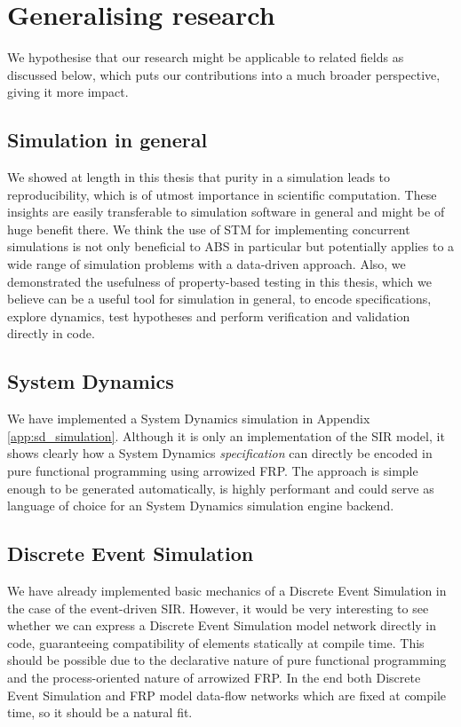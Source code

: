 \section{Generalising research}
We hypothesise that our research might be applicable to related fields as discussed below, which puts our contributions into a much broader perspective, giving it more impact.

\subsection{Simulation in general}
We showed at length in this thesis that purity in a simulation leads to reproducibility, which is of utmost importance in scientific computation. These insights are easily transferable to simulation software in general and might be of huge benefit there. %
We think the use of STM for implementing concurrent simulations is not only beneficial to ABS in particular but potentially applies to a wide range of simulation problems with a data-driven approach. Also, we demonstrated the usefulness of property-based testing in this thesis, which we believe can be a useful tool for simulation in general, to encode specifications, explore dynamics, test hypotheses and perform verification and validation directly in code.

\subsection{System Dynamics}
We have implemented a System Dynamics simulation in Appendix \ref{app:sd_simulation}. Although it is only an implementation of the SIR model, it shows clearly how a System Dynamics \textit{specification} can directly be encoded in pure functional programming using arrowized FRP. The approach is simple enough to be generated automatically, is highly performant and could serve as language of choice for an System Dynamics simulation engine backend.

\subsection{Discrete Event Simulation}
We have already implemented basic mechanics of a Discrete Event Simulation in the case of the event-driven SIR. However, it would be very interesting to see whether we can express a Discrete Event Simulation model network directly in code, guaranteeing compatibility of elements statically at compile time. This should be possible due to the declarative nature of pure functional programming and the process-oriented nature of arrowized FRP. In the end both Discrete Event Simulation and FRP model data-flow networks which are fixed at compile time, so it should be a natural fit.

